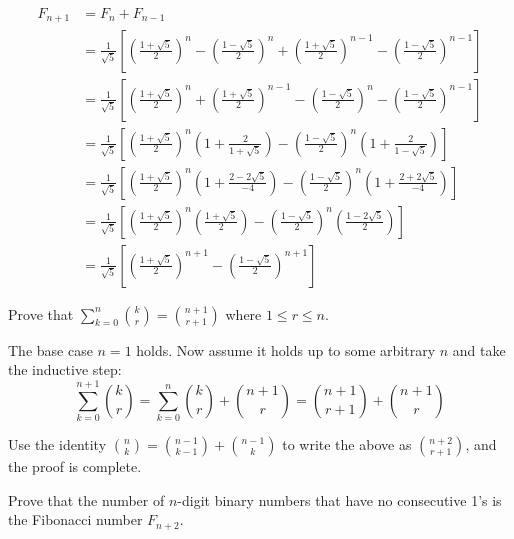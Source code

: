 \documentclass{article}
\begin{document}
\begin{align*}
    F_{n+1} & = F_n + F_{n-1}                                                                                                                                                                                           \\
            & = \frac{1}{\sqrt{5}}\left[ \left(\frac{1 + \sqrt{5}}{2} \right)^n - \left(\frac{1 - \sqrt{5}}{2}\right)^n + \left(\frac{1 + \sqrt{5}}{2}\right)^{n-1} - \left(\frac{1 - \sqrt{5}}{2}\right)^{n-1} \right] \\
            & = \frac{1}{\sqrt{5}}\left[ \left( \frac{1 + \sqrt{5}}{2}\right)^n + \left(\frac{1 + \sqrt{5}}{2}\right)^{n-1} - \left(\frac{1 - \sqrt{5}}{2}\right)^n - \left(\frac{1 - \sqrt{5}}{2}\right)^{n-1}\right]  \\
            & = \frac{1}{\sqrt{5}}\left[ \left(\frac{1 + \sqrt{5}}{2}\right)^n\left(1 + \frac{2}{1 + \sqrt{5}}\right)  - \left(\frac{1 - \sqrt{5}}{2}\right)^n\left(1 + \frac{2}{1 - \sqrt{5}}\right)\right]            \\
            & = \frac{1}{\sqrt{5}}\left[ \left(\frac{1 + \sqrt{5}}{2}\right)^n\left(1 + \frac{2 - 2\sqrt{5}}{-4}\right)  - \left(\frac{1 - \sqrt{5}}{2}\right)^n\left(1 + \frac{2 + 2\sqrt{5}}{-4}\right)\right]        \\
            & = \frac{1}{\sqrt{5}}\left[ \left(\frac{1 + \sqrt{5}}{2}\right)^n\left(\frac{1 + \sqrt{5}}{2}\right)  - \left(\frac{1 - \sqrt{5}}{2}\right)^n\left(\frac{1 -  2\sqrt{5}}{2}\right)\right]                  \\
            & = \frac{1}{\sqrt{5}}\left[ \left(\frac{1 + \sqrt{5}}{2}\right)^{n+1} - \left(\frac{1 - \sqrt{5}}{2}\right)^{n+1}\right]
\end{align*}

\begin{problem}
Prove that $\sum\limits_{k=0}^n \binom{k}{r} = \binom{n + 1}{r + 1}$ where $1 \leq r \leq n$.
\end{problem}

The base case $n = 1$ holds. Now assume it holds up to some arbitrary $n$ and take the inductive step:
$$\sum_{k=0}^{n+1}\binom{k}{r} = \sum_{k=0}^n \binom{k}{r} + \binom{n + 1}{r} = \binom{n + 1}{r + 1} + \binom{n + 1}{r}$$

Use the identity $\binom{n}{k} = \binom{n-1}{k - 1} + \binom{n-1}{k}$ to write the above as $\binom{n+2}{r + 1}$, and the proof is complete.

\begin{problem}
Prove that the number of $n$-digit binary numbers that have no consecutive 1's is the Fibonacci number $F_{n+2}$.
\end{problem}
\end{document}
